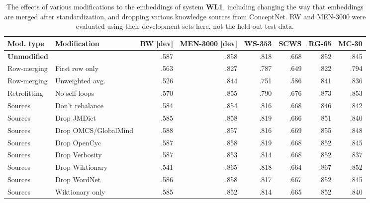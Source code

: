 \documentclass[letterpaper]{article}
\begin{document}
\begin{table*}[t]
\centering
\begin{tabular}{llrrrrrr}
\toprule
Mod. type       & Modification & RW [dev] & MEN-3000 [dev] & WS-353 & SCWS &  RG-65 &  MC-30 \\
\midrule
{\bf Unmodified}&                     & .587 &      .858 &    .818 &  .668 &   .852 &   .845 \\
\midrule
Row-merging     & First row only      & .563 &      .827 &    .787 &  .649 &   .822 &   .794 \\
Row-merging     & Unweighted avg.     & .526 &      .844 &    .751 &  .586 &   .841 &   .836 \\
\midrule
Retrofitting    & No self-loops       & .570 &      .855 &    .790 &  .676 &   .873 &   .853 \\
\midrule
Sources         & Don't rebalance     & .584 &      .854 &    .816 &  .668 &   .846 &   .842 \\
Sources         & Drop JMDict         & .585 &      .858 &    .819 &  .666 &   .851 &   .840 \\
Sources         & Drop OMCS/GlobalMind& .588 &      .857 &    .816 &  .669 &   .855 &   .848 \\
Sources         & Drop OpenCyc        & .587 &      .858 &    .819 &  .668 &   .852 &   .845 \\
Sources         & Drop Verbosity      & .587 &      .853 &    .814 &  .668 &   .852 &   .837 \\
Sources         & Drop Wiktionary     & .541 &      .865 &    .818 &  .664 &   .867 &   .852 \\
Sources         & Drop WordNet        & .586 &      .858 &    .817 &  .667 &   .852 &   .845 \\
Sources         & Wiktionary only     & .585 &      .852 &    .814 &  .665 &   .852 &   .840 \\
\bottomrule
\end{tabular}
\caption{
    The effects of various modifications to the embeddings of system {\bf WL1},
    including changing the way that embeddings are merged after
    standardization, and dropping various knowledge sources from ConceptNet.
    RW and MEN-3000 were evaluated using their development sets here,
    not the held-out test data.
}
\label{eval-variations}
\end{table*}
\end{document}
